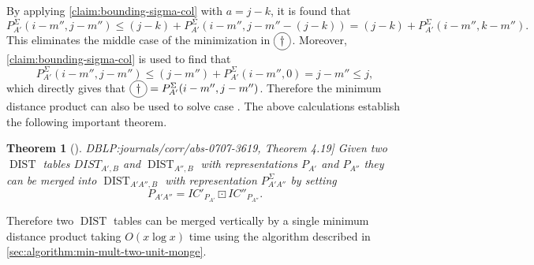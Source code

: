 \documentclass[twoside,11pt,openright]{report}
\newcommand{\DIST}{\operatorname{DIST}}
\newcommand*{\circled}[1]{\tikz[baseline=(char.base)]{
                          \node[shape=circle,draw,inner sep=2pt] (char) {#1};}}
\newcommand{\refbook}[2]{\cite[#1]{DBLP:journals/corr/abs-0707-3619}, #2}
\newtheorem{theorem}{Theorem}
\begin{document}
By applying \cref{claim:bounding-sigma-col} with $a = j - k$, it is found that
\[
  P_{A'}^{\Sigma}(i - m'', j - m'') \leq (j - k) + P_{A'}^{\Sigma}(i - m'', j - m'' - (j - k)) = (j - k) + P_{A'}^{\Sigma}(i - m'', k - m'').
\]
This eliminates the middle case of the minimization in $\circled{$\dagger$}$. Moreover, \cref{claim:bounding-sigma-col} is used to find that
\[
  P_{A'}^{\Sigma}(i - m'', j - m'') \leq (j - m'') + P_{A'}^{\Sigma}(i - m'', 0) = j - m'' \leq j,
\]
which directly gives that $\circled{$\dagger$} = P_{A'}^{\Sigma}(i - m'', j - m'')$. Therefore the minimum distance product can also be used to solve case \circled{2}. The above calculations establish the following important theorem.
\begin{theorem}[\refbook{p.-55}{Theorem 4.19}]
  \label{thm:dist-vertical-merge}
  Given two $\DIST$ tables $DIST_{A',B}$ and $\DIST_{A'',B}$ with representations $P_{A'}$ and $P_{A''}$ they can be merged into $\DIST_{A'A'',B}$ with representation $P_{A'A''}^{\Sigma}$ by setting
  \[
    P_{A'A''} = IC'_{P_{A'}} \boxdot IC''_{P_{A''}} .
  \]
\end{theorem}

 Therefore two $\DIST$ tables can be merged vertically by a single minimum distance product taking $O(x \log{x})$ time using the algorithm described in \cref{sec:algorithm:min-mult-two-unit-monge}.
\end{document}
